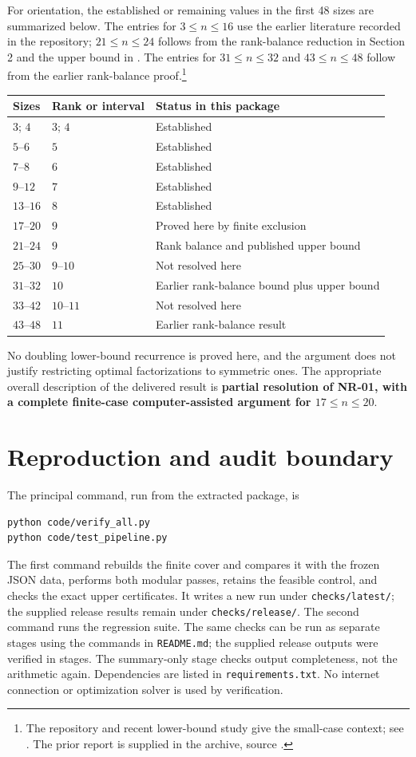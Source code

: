 \documentclass[11pt]{article}
\theoremstyle{definition}
\begin{document}
For orientation, the established or remaining values in the first 48 sizes are summarized below. The entries for $3\le n\le16$ use the earlier literature recorded in the repository; $21\le n\le24$ follows from the rank-balance reduction in Section 2 and the upper bound in \cite{vgg}. The entries for $31\le n\le32$ and $43\le n\le48$ follow from the earlier rank-balance proof.\footnote{The repository and recent lower-bound study give the small-case context; see \cite{repo,bvg}. The prior report is supplied in the archive, source \cite{prior}.}
\begin{center}
\begin{tabular}{lll}
\toprule
Sizes&Rank or interval&Status in this package\\\midrule
$3$; $4$&$3$; $4$&Established\\
$5$--$6$&$5$&Established\\
$7$--$8$&$6$&Established\\
$9$--$12$&$7$&Established\\
$13$--$16$&$8$&Established\\
$17$--$20$&$9$&Proved here by finite exclusion\\
$21$--$24$&$9$&Rank balance and published upper bound\\
$25$--$30$&$9$--$10$&Not resolved here\\
$31$--$32$&$10$&Earlier rank-balance bound plus upper bound\\
$33$--$42$&$10$--$11$&Not resolved here\\
$43$--$48$&$11$&Earlier rank-balance result\\\bottomrule
\end{tabular}
\end{center}
No doubling lower-bound recurrence is proved here, and the argument does not justify restricting optimal factorizations to symmetric ones. The appropriate overall description of the delivered result is \textbf{partial resolution of NR-01, with a complete finite-case computer-assisted argument for $17\le n\le20$}.

\section{Reproduction and audit boundary}
The principal command, run from the extracted package, is
\begin{verbatim}
python code/verify_all.py
python code/test_pipeline.py
\end{verbatim}
The first command rebuilds the finite cover and compares it with the frozen JSON data, performs both modular passes, retains the feasible control, and checks the exact upper certificates. It writes a new run under \texttt{checks/latest/}; the supplied release results remain under \texttt{checks/release/}. The second command runs the regression suite. The same checks can be run as separate stages using the commands in \texttt{README.md}; the supplied release outputs were verified in stages. The summary-only stage checks output completeness, not the arithmetic again. Dependencies are listed in \texttt{requirements.txt}. No internet connection or optimization solver is used by verification.
\end{document}
